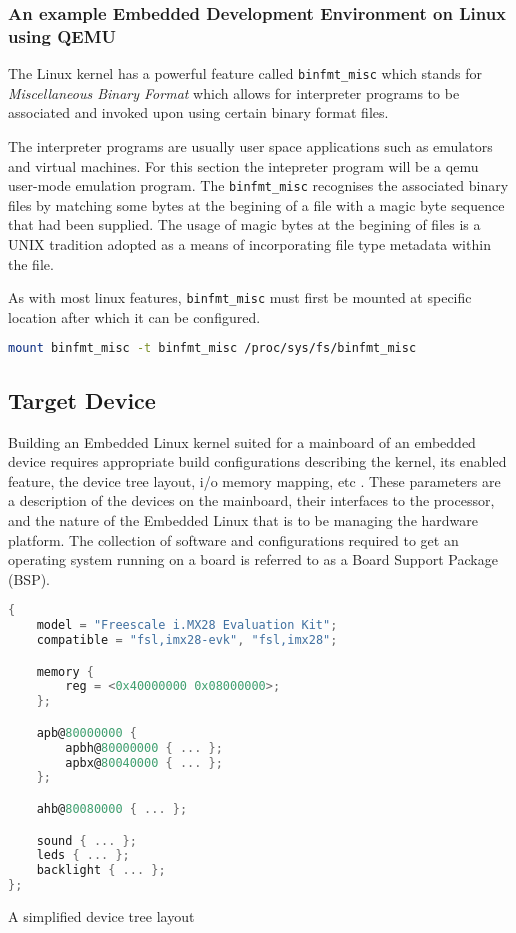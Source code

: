 \subsubsection{An example Embedded Development Environment on Linux using QEMU}

The Linux kernel has a powerful feature called \texttt{binfmt\_misc} which stands for \textit{Miscellaneous Binary Format} which allows for interpreter programs to be associated and invoked upon using certain binary format files.

The interpreter programs are usually user space applications such as emulators and virtual machines. For this section the intepreter program will be a qemu user-mode emulation program. The \texttt{binfmt\_misc} recognises the associated binary files by matching some bytes at the begining of a file with a magic byte sequence that had been supplied. The usage of magic bytes at the begining of files is a UNIX tradition adopted as a means of incorporating file type metadata within the file.

As with most linux features, \texttt{binfmt\_misc} must first be mounted at specific location after which it can be configured.

\begin{lstlisting}[language=Bash]
	mount binfmt_misc -t binfmt_misc /proc/sys/fs/binfmt_misc
\end{lstlisting}

\subsection{Target Device}

Building an Embedded Linux kernel suited for a mainboard of an embedded device requires appropriate build configurations describing the kernel, its enabled feature, the device tree layout, i/o memory mapping, etc \cite{bootlin-port}. These parameters are a description of the devices on the mainboard, their interfaces to the processor, and the nature of the Embedded Linux that is to be managing the hardware platform. The collection of software and configurations required to get an operating system running on a board is referred to as a Board Support Package (BSP).

\begin{lstfloat}
\begin{lstlisting}[language=C]
{
	model = "Freescale i.MX28 Evaluation Kit";
	compatible = "fsl,imx28-evk", "fsl,imx28";

	memory {
		reg = <0x40000000 0x08000000>;
	};

	apb@80000000 {
		apbh@80000000 { ... };
		apbx@80040000 { ... };
	};

	ahb@80080000 { ... };

	sound { ... };
	leds { ... };
	backlight { ... };
};
\end{lstlisting}
\caption{A simplified device tree layout}
\label{listing:device-tree}
\end{lstfloat}

